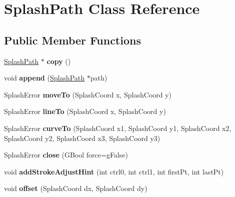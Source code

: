 \hypertarget{class_splash_path}{}\section{Splash\+Path Class Reference}
\label{class_splash_path}
\subsection*{Public Member Functions}
\begin{DoxyCompactItemize}
\item 
\mbox{\label{class_splash_path_a31b2fc4a73fb18b86265d6ca7e42d501}} 
\hyperlink{class_splash_path}{Splash\+Path} $\ast$ {\bfseries copy} ()
\item 
\mbox{\label{class_splash_path_a48db0f88c3d12f254dbd5f002c9c59c8}} 
void {\bfseries append} (\hyperlink{class_splash_path}{Splash\+Path} $\ast$path)
\item 
\mbox{\label{class_splash_path_ae90e4acc3b2c6bfbd8b13f1c7e098dce}} 
Splash\+Error {\bfseries move\+To} (Splash\+Coord x, Splash\+Coord y)
\item 
\mbox{\label{class_splash_path_a121d19aef6235737f0c119ee4e519607}} 
Splash\+Error {\bfseries line\+To} (Splash\+Coord x, Splash\+Coord y)
\item 
\mbox{\label{class_splash_path_ae67d06395f63eccba0652233cc83f63d}} 
Splash\+Error {\bfseries curve\+To} (Splash\+Coord x1, Splash\+Coord y1, Splash\+Coord x2, Splash\+Coord y2, Splash\+Coord x3, Splash\+Coord y3)
\item 
\mbox{\label{class_splash_path_a458b6e00f1883a35f41bf860d3c86c7c}} 
Splash\+Error {\bfseries close} (G\+Bool force=g\+False)
\item 
\mbox{\label{class_splash_path_a8a43c05ae57d4290553523cd053fc800}} 
void {\bfseries add\+Stroke\+Adjust\+Hint} (int ctrl0, int ctrl1, int first\+Pt, int last\+Pt)
\item 
\mbox{\label{class_splash_path_a253ebd27456f657038b9bfcf2eb3185d}} 
void {\bfseries offset} (Splash\+Coord dx, Splash\+Coord dy)

\end{DoxyCompactItemize}
